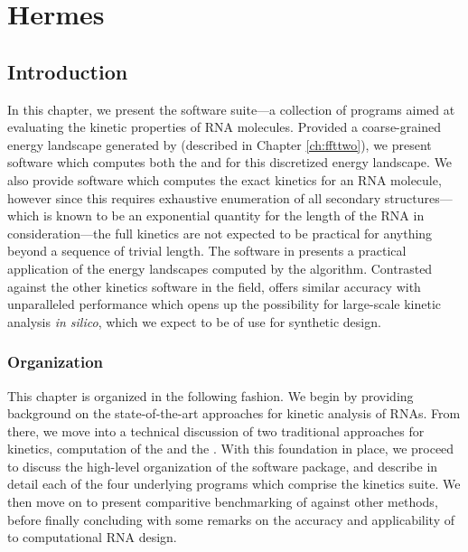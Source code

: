 
\chapter{Hermes}
\label{ch:hermes}


\section{Introduction}
\label{sec:hermes:intro}

In this chapter, we present the \hermes software suite---a collection of
programs aimed at evaluating the kinetic properties of RNA molecules.
Provided a coarse-grained energy landscape generated by \ffttwo (described
in Chapter \ref{ch:ffttwo}), we present software which computes both the \mfpt
and \eqt for this discretized energy landscape. We also provide software which
computes the exact kinetics for an RNA molecule, however since this requires
exhaustive enumeration of all secondary structures---which is known to be an
exponential quantity for the length of the RNA in consideration---the full
kinetics are not expected to be practical for anything beyond a sequence of
trivial length. The software in \hermes presents a practical application of
the energy landscapes computed by the \ffttwo algorithm. Contrasted against
the other kinetics software in the field, \hermes offers similar accuracy
with unparalleled performance which opens up the possibility for large-scale
kinetic analysis {\em in silico}, which we expect to be of use for synthetic
design.

\subsection{Organization}
\label{subsec:hermes:org}

This chapter is organized in the following fashion. We begin by providing
background on the state-of-the-art approaches for kinetic analysis of RNAs.
From there, we move into a technical discussion of two traditional approaches
for kinetics, computation of the \mfpt and the \eqt. With this foundation in
place, we proceed to discuss the high-level organization of the \hermes
software package, and describe in detail each of the four underlying programs
which comprise the kinetics suite. We then move on to present comparitive
benchmarking of \hermes against other methods, before finally concluding with
some remarks on the accuracy and applicability of \hermes to computational
RNA design.

